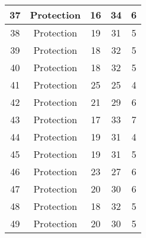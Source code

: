 \documentclass[results.tex]{subfiles}
\begin{document}
\begin{center}
\begin{tabular}{| c || c | c | c | c |}
            \hline
            37                      & Protection                   & 16                     & 34                      & 6                    \\
            \hline
            38                      & Protection                   & 19                     & 31                      & 5                    \\
            \hline
            39                      & Protection                   & 18                     & 32                      & 5                    \\
            \hline
            40                      & Protection                   & 18                     & 32                      & 5                    \\
            \hline
            41                      & Protection                   & 25                     & 25                      & 4                    \\
            \hline
            42                      & Protection                   & 21                     & 29                      & 6                    \\
            \hline
            43                      & Protection                   & 17                     & 33                      & 7                    \\
            \hline
            44                      & Protection                   & 19                     & 31                      & 4                    \\
            \hline
            45                      & Protection                   & 19                     & 31                      & 5                    \\
            \hline
            46                      & Protection                   & 23                     & 27                      & 6                    \\
            \hline
            47                      & Protection                   & 20                     & 30                      & 6                    \\
            \hline
            48                      & Protection                   & 18                     & 32                      & 5                    \\
            \hline
            49                      & Protection                   & 20                     & 30                      & 5                    \\
            \hline
        \end{tabular}
    \end{center}
\end{document}
